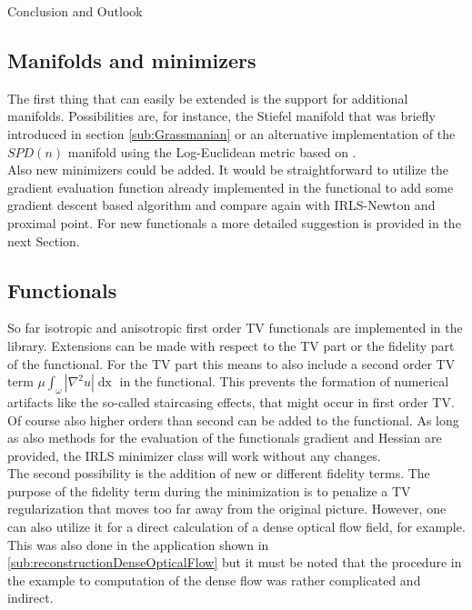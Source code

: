 \begin{chapter}{Conclusion and Outlook}
\subsection{Manifolds and minimizers}
The first thing that can easily be extended is the support for additional manifolds. Possibilities are, for instance, the Stiefel manifold that
was briefly introduced in section \ref{sub:Grassmanian} or an alternative implementation of the $SPD(n)$ manifold using the Log-Euclidean metric
based on \cite{Arsigny}.\\

Also new minimizers could be added. It would be straightforward to utilize the gradient evaluation function already implemented in the functional to
add some gradient descent based algorithm and compare again with IRLS-Newton and proximal point. For new functionals a more detailed suggestion
is provided in the next Section.

\subsection{Functionals} %
\label{sub:Functionals}
So far isotropic and anisotropic first order TV functionals are implemented in the library. Extensions can be made with respect to the TV part or the fidelity
part of the functional. For the TV part this means to also include a second order TV term $\mu\int_{\omega}|\nabla^2u|\mathop{dx}$ in the functional.
This prevents the formation of numerical artifacts like the so-called staircasing effects, that might occur in first order TV. Of course also higher orders than second
can be added to the functional. As long as also methods for the evaluation of the functionals gradient and Hessian are provided, the IRLS minimizer class will
work without any changes. \\

The second possibility is the addition of new or different fidelity terms. The purpose of the fidelity term during the minimization is to penalize a TV
regularization that moves too far away from the original picture. However, one can also utilize it for a direct calculation of a dense optical flow field, for
example. This was also done in the application shown in \ref{sub:reconstructionDenseOpticalFlow} but it must be noted that the procedure in the example to computation of the dense flow was rather complicated and indirect.\\


\end{chapter}
